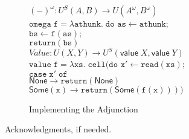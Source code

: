 \documentclass[preprint]{sigplanconf}
\newcommand{\term}[1]{\ensuremath{\mathtt{{#1}}}}
\newcommand{\valtype}[1]{\mathsf{value}\;{#1}}
\newcommand{\None}{\mathsf{None}}
\newcommand{\Some}[1]{\mathsf{Some}({#1})}
\begin{document}
\begin{figure}
\begin{tabbing}
$(-)^\omega : U^S(A,B) \to U(A^\omega, B^\omega)$ \\
\term{omega\;f = \lambda athunk.\;do} \=\term{as \leftarrow athunk;} \\
                                      \>\term{bs \leftarrow f(as);} \\
                                      \>\term{return(bs)} 
\\[1em]

$\mathit{Value} : U(X,Y) \to U^S(\valtype{X}, \valtype{Y})$ \\[0.2em]
\term{value\;f = \lambda xs.\;cell(do} \=\term{x' \leftarrow read(xs);}\\
                                       \>\term{case\;x'\;of}\\
                                       \>\;\;\=\term{\None \to return(\None)} \\
                                       \>\>    \term{\Some{x} \to return(\Some{f(x)}))}

  
\end{tabbing}
\caption{Implementing the Adjunction}
\label{adjoint-implementation}  
\end{figure}


\acks

Acknowledgments, if needed.






\end{document}
